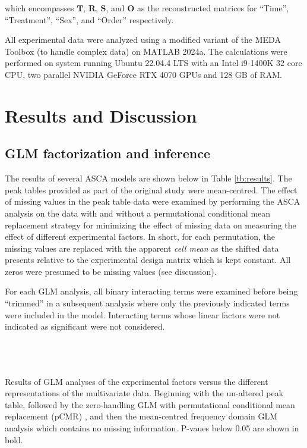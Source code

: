 \documentclass[preprint,12pt]{elsarticle}
\begin{document}
\noindent which encompasses $\mathbf{T}$, $\mathbf{R}$, $\mathbf{S}$, and $\mathbf{O}$ as the reconstructed matrices for ``Time'', ``Treatment'', ``Sex'', and ``Order'' respectively. 

All experimental data were analyzed using a modified variant of the MEDA Toolbox (to handle complex data) on MATLAB 2024a. The calculations were performed on system running Ubuntu 22.04.4 LTS with an Intel i9-1400K 32 core CPU, two parallel NVIDIA GeForce RTX 4070 GPUs and 128 GB of RAM.

\section{Results and Discussion}

\subsection{GLM factorization and inference}

The results of several ASCA models are shown below in Table \ref{tb:results}. The peak tables provided as part of the original study were mean-centred. The effect of missing values in the peak table data were examined by performing the ASCA analysis on the data with and without a permutational conditional mean replacement strategy for minimizing the effect of missing data on measuring the effect of different experimental factors. In short, for each permutation, the missing values are replaced with the apparent \textit{cell mean} as the shifted data presents relative to the experimental design matrix which is kept constant. All zeros were presumed to be missing values (see discussion).

For each GLM analysis, all binary interacting terms were examined before being ``trimmed'' in a subsequent analysis where only the previously indicated terms were included in the model. Interacting terms whose linear factors were not indicated as significant were not considered.

\begin{table} %
 \\
 \\ 
 \\

\caption{Results of GLM analyses of the experimental factors versus the different representations of the multivariate data. Beginning with the un-altered peak table, followed by the zero-handling GLM with permutational conditional mean replacement (pCMR) \cite{pCMR}, and then the mean-centred frequency domain GLM analysis which contains no missing information. P-vaues below 0.05 are shown in bold.}
\label{tb:results}

\end{table}
\end{document}
